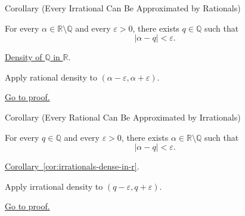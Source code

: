 \begin{corollarybox}{Corollary (Every Irrational Can Be Approximated by Rationals)}
\begin{corollary}
\label{cor:every-irrational-can-be-approximated-by-rationals}
For every $\alpha\in\mathbb{R}\setminus\mathbb{Q}$ and every $\varepsilon>0$,
there exists $q\in\mathbb{Q}$ such that
\[
|\alpha-q|<\varepsilon.
\]
\end{corollary}
\end{corollarybox}
\begin{dependencies}
\hyperref[thm:q-dense-in-r]{Density of $\mathbb{Q}$ in $\mathbb{R}$}.
\end{dependencies}
\begin{remark*}
Apply rational density to $(\alpha-\varepsilon,\alpha+\varepsilon)$.
\end{remark*}
\begin{remark*}[Proof]
\hyperref[prf:every-irrational-can-be-approximated-by-rationals]{Go to proof.}
\end{remark*}

\begin{corollarybox}{Corollary (Every Rational Can Be Approximated by Irrationals)}
\begin{corollary}
\label{cor:every-rational-can-be-approximated-by-irrationals}
For every $q\in\mathbb{Q}$ and every $\varepsilon>0$, there exists
$\alpha\in\mathbb{R}\setminus\mathbb{Q}$ such that
\[
|\alpha-q|<\varepsilon.
\]
\end{corollary}
\end{corollarybox}
\begin{dependencies}
\hyperref[cor:irrationals-dense-in-r]{Corollary~\ref*{cor:irrationals-dense-in-r}}.
\end{dependencies}
\begin{remark*}
Apply irrational density to $(q-\varepsilon,q+\varepsilon)$.
\end{remark*}
\begin{remark*}[Proof]
\hyperref[prf:every-rational-can-be-approximated-by-irrationals]{Go to proof.}
\end{remark*}

